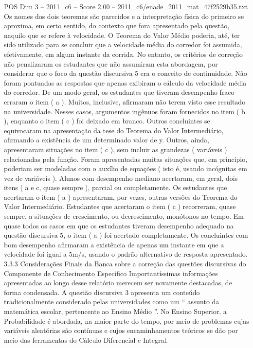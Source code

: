 \begin{textsample}{POS Dim 3 – 2011\_c6 – Score 2.00 – 2011\_c6/enade\_2011\_mat\_47f2529b35.txt}
Os nomes dos dois teoremas são parecidos e a interpretação física do primeiro se aproxima, em certo sentido, do contexto que fora apresentado pela questão, naquilo que se refere à velocidade.
O Teorema do Valor Médio poderia, até, ter sido utilizado para se concluir que a velocidade média do corredor foi assumida, efetivamente, em algum instante da corrida.
No entanto, os critérios de correção não penalizaram os estudantes que não assumiram esta abordagem, por considerar que o foco da questão discursiva 5 era o conceito de continuidade.
Não foram pontuadas as respostas que apenas exibiram o cálculo da velocidade média do corredor.
De um modo geral, os estudantes que tiveram desempenho fraco erraram o item ( a ).
Muitos, inclusive, afirmaram não terem visto esse resultado na universidade.
Nesses casos, argumentos ingênuos foram fornecidos no item ( b ), enquanto o item ( c ) foi deixado em branco.
Outros concluintes se equivocaram na apresentação da tese do Teorema do Valor Intermediário, afirmando a existência de um determinado valor de y.
Outros, ainda, apresentaram situações no item ( c ), sem incluir as grandezas ( variáveis ) relacionadas pela função.
Foram apresentadas muitas situações que, em princípio, poderiam ser modeladas com o auxílio de equações ( isto é, usando incógnitas em vez de variáveis ).
Alunos com desempenho mediano acertaram, em geral, dois itens ( a e c, quase sempre ), parcial ou completamente.
Os estudantes que acertaram o item ( a ) apresentaram, por vezes, outras versões do Teorema do Valor Intermediário.
Estudantes que acertaram o item ( c ) recorreram, quase sempre, a situações de crescimento, ou decrescimento, monótonos no tempo.
Em quase todos os casos em que os estudantes tiveram desempenho adequado na questão discursiva 5, o item ( a ) foi acertado completamente.
Os concluintes com bom desempenho afirmaram a existência de apenas um instante em que a velocidade foi igual a 5m/s, usando o padrão alternativo de resposta apresentado. 3.3.3 Considerações Finais da Banca sobre a correção das questões discursivas do Componente de Conhecimento Específico Importantíssimas informações apresentadas ao longo desse relatório merecem ser novamente destacadas, de forma condensada.
A questão discursiva 3 apresenta um conteúdo tradicionalmente considerado pelas universidades como um “ assunto da matemática escolar, pertencente ao Ensino Médio ”.
No Ensino Superior, a Probabilidade é abordada, na maior parte do tempo, por meio de problemas cujas variáveis aleatórias são contínuas e cujos encaminhamentos teóricos se dão por meio das ferramentas do Cálculo Diferencial e Integral.

\end{textsample}
